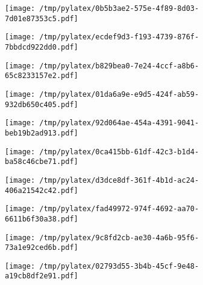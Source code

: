 \documentclass{article}
\begin{document}
\begin{figure}[htbp]
\begin{subfigure}[b]{.3\linewidth}
\texttt{[image: /tmp/pylatex/0b5b3ae2-575e-4f89-8d03-7d01e87353c5.pdf]}
\end{subfigure}
\begin{subfigure}[b]{.3\linewidth}
\texttt{[image: /tmp/pylatex/ecdef9d3-f193-4739-876f-7bbdcd922dd0.pdf]}
\end{subfigure}
\begin{subfigure}[b]{.3\linewidth}
\texttt{[image: /tmp/pylatex/b829bea0-7e24-4ccf-a8b6-65c8233157e2.pdf]}
\end{subfigure}
\begin{subfigure}[b]{.3\linewidth}
\texttt{[image: /tmp/pylatex/01da6a9e-e9d5-424f-ab59-932db650c405.pdf]}
\end{subfigure}
\begin{subfigure}[b]{.3\linewidth}
\texttt{[image: /tmp/pylatex/92d064ae-454a-4391-9041-beb19b2ad913.pdf]}
\end{subfigure}
\begin{subfigure}[b]{.3\linewidth}
\texttt{[image: /tmp/pylatex/0ca415bb-61df-42c3-b1d4-ba58c46cbe71.pdf]}
\end{subfigure}
\begin{subfigure}[b]{.3\linewidth}
\texttt{[image: /tmp/pylatex/d3dce8df-361f-4b1d-ac24-406a21542c42.pdf]}
\end{subfigure}
\begin{subfigure}[b]{.3\linewidth}
\texttt{[image: /tmp/pylatex/fad49972-974f-4692-aa70-6611b6f30a38.pdf]}
\end{subfigure}
\begin{subfigure}[b]{.3\linewidth}
\texttt{[image: /tmp/pylatex/9c8fd2cb-ae30-4a6b-95f6-73a1e92ced6b.pdf]}
\end{subfigure}
\begin{subfigure}[b]{.3\linewidth}
\texttt{[image: /tmp/pylatex/02793d55-3b4b-45cf-9e48-a19cb8df2e91.pdf]}
\end{subfigure}
\end{figure}
\end{document}
